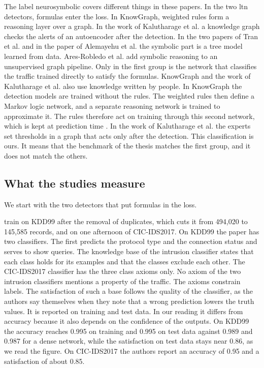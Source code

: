 The label neurosymbolic covers different things in these papers. In the two
\gls{ltn} detectors, formulas enter the loss. In KnowGraph, weighted rules form
a reasoning layer over a graph. In the work of Kalutharage et al. a knowledge
graph checks the alerts of an autoencoder after the detection. In the two papers
of Tran et al. and in the paper of Alemayehu et al. the symbolic part is a tree
model learned from data. Ares-Robledo et al. add symbolic reasoning to an
unsupervised graph pipeline. Only in the first group is the network that
classifies the traffic trained directly to satisfy the formulas. KnowGraph and
the work of Kalutharage et al. also use knowledge written by people. In
KnowGraph the detection models are trained without the rules. The weighted rules
then define a Markov logic network, and a separate reasoning network is trained
to approximate it. The rules therefore act on training through this second
network, which is kept at prediction time \citep{zhou2024knowgraph}. In the work
of Kalutharage et al. the
experts set thresholds in a graph that acts only after the detection.
This classification is ours. It means that the benchmark of the thesis matches the
first group, and it does not match the others.

\subsection{What the studies measure}
\label{sec:critical-reading}

We start with the two detectors that put formulas in the loss.

\citet{onchis2022neurosymbolic} train on KDD99 after the removal of duplicates,
which cuts it from 494{,}020 to 145{,}585 records, and on one afternoon of
CIC-IDS2017. On KDD99 the paper has two classifiers. The first predicts the
protocol type and the connection status and serves to show queries. The
knowledge base of the intrusion classifier states that each class holds for its
examples and that the classes exclude each other. The CIC-IDS2017 classifier has
the three class axioms only. No axiom of the two intrusion classifiers mentions a
property of the traffic. The axioms constrain labels. The satisfaction of such a
base follows the quality of the classifier, as the authors say themselves when
they note that a wrong prediction lowers the truth values. It is reported on
training and test data. In our reading it differs from accuracy because it also
depends on the confidence of the outputs. On KDD99 the accuracy reaches 0.995 on training and 0.995 on test data
against 0.989 and 0.987 for a dense network, while the satisfaction on test data
stays near 0.86, as we read the figure. On CIC-IDS2017 the authors report an
accuracy of 0.95 and a satisfaction of about 0.85.

